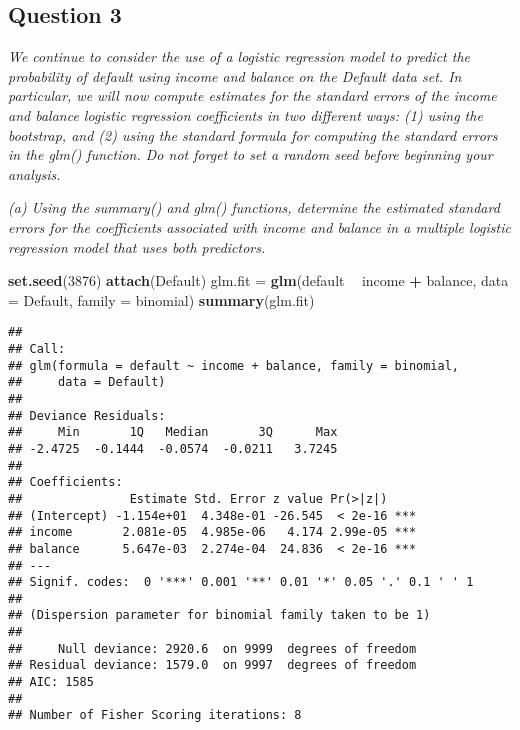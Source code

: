 \documentclass[]{article}
\newenvironment{Shaded}{\begin{snugshade}}{\end{snugshade}}
\newcommand{\KeywordTok}[1]{\textcolor[rgb]{0.13,0.29,0.53}{\textbf{#1}}}
\newcommand{\DataTypeTok}[1]{\textcolor[rgb]{0.13,0.29,0.53}{#1}}
\newcommand{\DecValTok}[1]{\textcolor[rgb]{0.00,0.00,0.81}{#1}}
\newcommand{\StringTok}[1]{\textcolor[rgb]{0.31,0.60,0.02}{#1}}
\newcommand{\OperatorTok}[1]{\textcolor[rgb]{0.81,0.36,0.00}{\textbf{#1}}}
\newcommand{\NormalTok}[1]{#1}
\begin{document}
\subsection{Question 3}\label{question-3}

 \emph{We continue to consider the use of a logistic regression model to
predict the probability of default using income and balance on the
Default data set. In particular, we will now compute estimates for the
standard errors of the income and balance logistic regression
coefficients in two different ways: (1) using the bootstrap, and (2)
using the standard formula for computing the standard errors in the
glm() function. Do not forget to set a random seed before beginning your
analysis.}

\emph{(a) Using the summary() and glm() functions, determine the
estimated standard errors for the coefficients associated with income
and balance in a multiple logistic regression model that uses both
predictors.}

\begin{Shaded}
\begin{Highlighting}[]
\KeywordTok{set.seed}\NormalTok{(}\DecValTok{3876}\NormalTok{)}
\KeywordTok{attach}\NormalTok{(Default)}
\NormalTok{glm.fit =}\StringTok{ }\KeywordTok{glm}\NormalTok{(default }\OperatorTok{~}\StringTok{ }\NormalTok{income }\OperatorTok{+}\StringTok{ }\NormalTok{balance, }\DataTypeTok{data =}\NormalTok{ Default, }\DataTypeTok{family =}\NormalTok{ binomial)}
\KeywordTok{summary}\NormalTok{(glm.fit)}
\end{Highlighting}
\end{Shaded}

\begin{verbatim}
## 
## Call:
## glm(formula = default ~ income + balance, family = binomial, 
##     data = Default)
## 
## Deviance Residuals: 
##     Min       1Q   Median       3Q      Max  
## -2.4725  -0.1444  -0.0574  -0.0211   3.7245  
## 
## Coefficients:
##               Estimate Std. Error z value Pr(>|z|)    
## (Intercept) -1.154e+01  4.348e-01 -26.545  < 2e-16 ***
## income       2.081e-05  4.985e-06   4.174 2.99e-05 ***
## balance      5.647e-03  2.274e-04  24.836  < 2e-16 ***
## ---
## Signif. codes:  0 '***' 0.001 '**' 0.01 '*' 0.05 '.' 0.1 ' ' 1
## 
## (Dispersion parameter for binomial family taken to be 1)
## 
##     Null deviance: 2920.6  on 9999  degrees of freedom
## Residual deviance: 1579.0  on 9997  degrees of freedom
## AIC: 1585
## 
## Number of Fisher Scoring iterations: 8
\end{verbatim}
\end{document}
